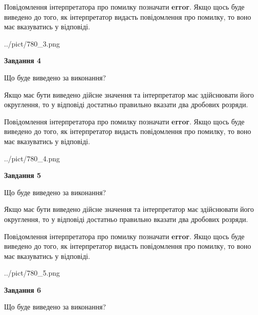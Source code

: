 \documentclass[12pt, ukrainian]{article}
\begin{document}
{\begin {Large}
Повідомлення інтерпретатора про помилку позначати \textbf{error}.
Якщо щось буде виведено до того, як інтерпретатор видасть повідомлення про помилку, 
то воно має вказуватись у відповіді. \par

\begin{center}
	{../pict/780_3.png}
\end{center}
\newpage

{\begin {center}\textbf{Завдання 4}\end {center}}\par
Що буде виведено за виконання? \par

Якщо має бути виведено дійсне значення та інтерпретатор має здійснювати його округлення, 
то у відповіді достатньо правильно вказати два дробових розряди.

Повідомлення інтерпретатора про помилку позначати \textbf{error}.
Якщо щось буде виведено до того, як інтерпретатор видасть повідомлення про помилку, 
то воно має вказуватись у відповіді. \par

\begin{center}
	{../pict/780_4.png}
\end{center}
\newpage

{\begin {center}\textbf{Завдання 5}\end {center}}\par
Що буде виведено за виконання? \par

Якщо має бути виведено дійсне значення та інтерпретатор має здійснювати його округлення, 
то у відповіді достатньо правильно вказати два дробових розряди.

Повідомлення інтерпретатора про помилку позначати \textbf{error}.
Якщо щось буде виведено до того, як інтерпретатор видасть повідомлення про помилку, 
то воно має вказуватись у відповіді. \par

\begin{center}
	{../pict/780_5.png}
\end{center}
\newpage

{\begin {center}\textbf{Завдання 6}\end {center}}\par
Що буде виведено за виконання? \par


\end{Large}}
\end{document}
